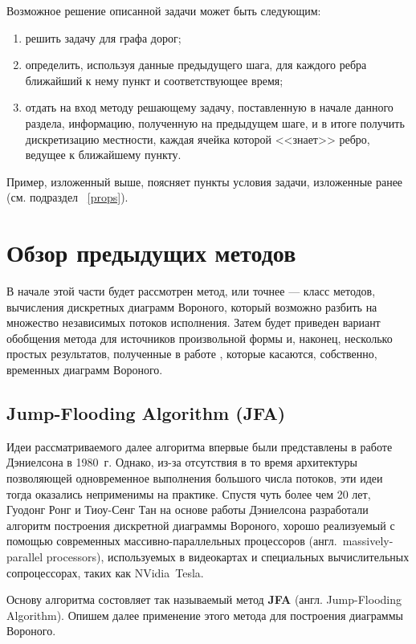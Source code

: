 \documentclass[12pt]{article}
\begin{document}
Возможное решение описанной задачи может быть следующим:
\begin{enumerate}
\item решить задачу для графа дорог;
\item определить, используя данные предыдущего шага, для каждого ребра 
ближайший к нему пункт и соответствующее время;
\item отдать на вход методу решающему задачу, поставленную в начале
данного раздела, информацию, полученную на предыдущем шаге,
и в итоге получить дискретизацию местности, каждая ячейка которой
<<знает>> ребро, ведущее к ближайшему пункту.
\end{enumerate}

Пример, изложенный выше, поясняет пункты условия задачи, изложенные ранее 
(см. подраздел ~\ref{props}).

\section{Обзор предыдущих методов}
\label{past}
В начале этой части будет рассмотрен метод, или точнее --- класс методов, 
вычисления дискретных диаграмм Вороного, который возможно разбить
на множество независимых потоков исполнения. Затем будет приведен
вариант обобщения метода для источников произвольной формы и, 
наконец, несколько простых результатов, полученные в работе \cite{timeb}, 
которые касаются, собственно, временных диаграмм Вороного.

\subsection{Jump-Flooding Algorithm (JFA)}
\label{jfa_desc}
Идеи рассматриваемого далее алгоритма впервые были представлены в работе
Дэниелсона \cite{distmap} в 1980~г. Однако, из-за отсутствия в то время
архитектуры позволяющей одновременное выполнения большого числа потоков,
эти идеи тогда оказались неприменимы на практике. Спустя чуть более чем 20 лет, 
Гуодонг Ронг и Тиоу-Сенг Тан \cite{jfa} на основе работы Дэниелсона разработали 
алгоритм построения дискретной диаграммы Вороного, хорошо реализуемый
с помощью современных массивно-параллельных процессоров 
(англ.~massively-parallel processors), используемых в видеокартах и
специальных вычислительных сопроцессорах, таких как NVidia\textregistered \, 
Tesla\texttrademark.


Основу алгоритма состовляет так называемый метод \textbf{JFA} (англ.
Jump-Flooding Algorithm). Опишем далее применение этого метода для 
построения диаграммы Вороного. 
\end{document}
